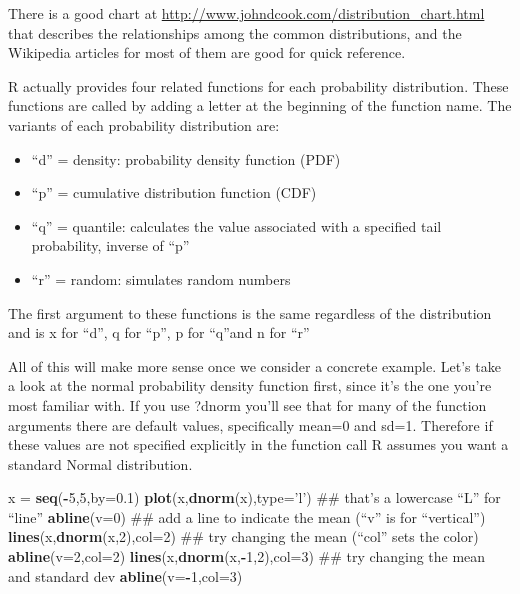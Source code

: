 \documentclass[]{article}
\newenvironment{Shaded}{\begin{snugshade}}{\end{snugshade}}
\newcommand{\KeywordTok}[1]{\textcolor[rgb]{0.13,0.29,0.53}{\textbf{#1}}}
\newcommand{\DataTypeTok}[1]{\textcolor[rgb]{0.13,0.29,0.53}{#1}}
\newcommand{\DecValTok}[1]{\textcolor[rgb]{0.00,0.00,0.81}{#1}}
\newcommand{\FloatTok}[1]{\textcolor[rgb]{0.00,0.00,0.81}{#1}}
\newcommand{\StringTok}[1]{\textcolor[rgb]{0.31,0.60,0.02}{#1}}
\newcommand{\OperatorTok}[1]{\textcolor[rgb]{0.81,0.36,0.00}{\textbf{#1}}}
\newcommand{\NormalTok}[1]{#1}
\providecommand{\tightlist}{%
  \setlength{\itemsep}{0pt}\setlength{\parskip}{0pt}}
\begin{document}
There is a good chart at
\url{http://www.johndcook.com/distribution_chart.html} that describes
the relationships among the common distributions, and the Wikipedia
articles for most of them are good for quick reference.

R actually provides four related functions for each probability
distribution. These functions are called by adding a letter at the
beginning of the function name. The variants of each probability
distribution are:

\begin{itemize}
\tightlist
\item
  ``d'' = density: probability density function (PDF)
\item
  ``p'' = cumulative distribution function (CDF)
\item
  ``q'' = quantile: calculates the value associated with a specified
  tail probability, inverse of ``p''
\item
  ``r'' = random: simulates random numbers
\end{itemize}

The first argument to these functions is the same regardless of the
distribution and is x for ``d'', q for ``p'', p for ``q''and n for ``r''

All of this will make more sense once we consider a concrete example.
Let's take a look at the normal probability density function first,
since it's the one you're most familiar with. If you use ?dnorm you'll
see that for many of the function arguments there are default values,
specifically mean=0 and sd=1. Therefore if these values are not
specified explicitly in the function call R assumes you want a standard
Normal distribution.

\begin{Shaded}
\begin{Highlighting}[]
\NormalTok{x =}\StringTok{ }\KeywordTok{seq}\NormalTok{(}\OperatorTok{-}\DecValTok{5}\NormalTok{,}\DecValTok{5}\NormalTok{,}\DataTypeTok{by=}\FloatTok{0.1}\NormalTok{)}
\KeywordTok{plot}\NormalTok{(x,}\KeywordTok{dnorm}\NormalTok{(x),}\DataTypeTok{type=}\StringTok{'l'}\NormalTok{)       ## that’s a lowercase “L” for “line”}
\KeywordTok{abline}\NormalTok{(}\DataTypeTok{v=}\DecValTok{0}\NormalTok{)                         ## add a line to indicate the mean (“v” is for “vertical”)}
\KeywordTok{lines}\NormalTok{(x,}\KeywordTok{dnorm}\NormalTok{(x,}\DecValTok{2}\NormalTok{),}\DataTypeTok{col=}\DecValTok{2}\NormalTok{)           ## try changing the mean (“col” sets the color)}
\KeywordTok{abline}\NormalTok{(}\DataTypeTok{v=}\DecValTok{2}\NormalTok{,}\DataTypeTok{col=}\DecValTok{2}\NormalTok{)}
\KeywordTok{lines}\NormalTok{(x,}\KeywordTok{dnorm}\NormalTok{(x,}\OperatorTok{-}\DecValTok{1}\NormalTok{,}\DecValTok{2}\NormalTok{),}\DataTypeTok{col=}\DecValTok{3}\NormalTok{)    ## try changing the mean and standard dev}
\KeywordTok{abline}\NormalTok{(}\DataTypeTok{v=}\OperatorTok{-}\DecValTok{1}\NormalTok{,}\DataTypeTok{col=}\DecValTok{3}\NormalTok{)}
\end{Highlighting}
\end{Shaded}
\end{document}
